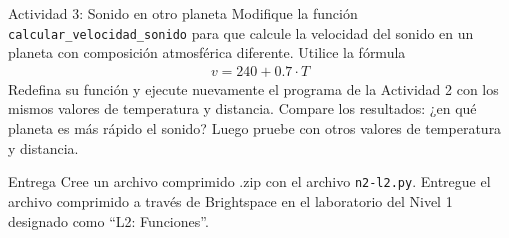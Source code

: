 \documentclass{ip-lab}
\begin{document}
\begin{sectionbox}{Actividad 3: Sonido en otro planeta}
Modifique la función \texttt{calcular\_velocidad\_sonido} para que calcule la velocidad del sonido en un planeta con composición atmosférica diferente. Utilice la fórmula
\begin{gather*}
    v = 240 + 0.7 \cdot T
\end{gather*}
Redefina su función y ejecute nuevamente el programa de la Actividad 2 con los mismos valores de temperatura y distancia. Compare los resultados: ¿en qué planeta es más rápido el sonido? Luego pruebe con otros valores de temperatura y distancia. 
\end{sectionbox}

\begin{sectionbox}{Entrega}
Cree un archivo comprimido .zip con el archivo \texttt{n2-l2.py}. Entregue el archivo comprimido a través de Brightspace en el laboratorio del Nivel 1 designado como ``L2: Funciones''.
\end{sectionbox}
\end{document}
